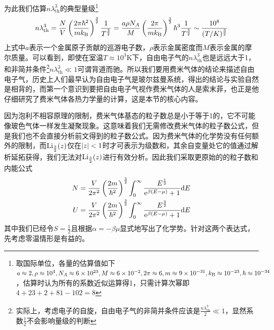 \documentclass[../../main.tex]{subfiles}
\begin{document}
为此我们估算\(n\lambda_{\mathrm{th}}^3\)的典型量级\footnote{取国际单位，各量的估算值如下\(a\approx2,\rho\approx10^{4},N_A\approx6\times10^{23},M\approx6\times10^{-2},2\pi\approx6,m\approx9\times10^{-31},k_{\mathrm{B}}\approx10^{-23},\hbar\approx10^{-34}\)，估算时认为所有的系数近似运算得1，只需计算次幂即\(4+23+2+81-102=8\)}
\begin{equation}
    n\lambda_{\mathrm{th}}^3=\frac{N}{V}\left(\frac{2\pi\hbar^2}{mk_{\mathrm{B}}}\right)^{\frac{3}{2}}\frac{1}{T^{\frac{3}{2}}}=\frac{a\rho N_A}{M}\left(\frac{2\pi}{mk_{\mathrm{B}}}\right)^{\frac{3}{2}}\hbar^3\frac{1}{T^{\frac{3}{2}}}\sim \frac{10^8}{(T/K)^{\frac{3}{2}}}
\end{equation}
上式中\(a\)表示一个金属原子贡献的巡游电子数，\(\rho\)表示金属密度而\(M\)表示金属的摩尔质量。可以看到，即使在室温\(T\approx10^3 \mathrm{K}\)下，自由电子气的\(n\lambda_{\mathrm{th}}^3\)也是远远大于1，和非简并条件\footnote{实际上，考虑电子的自旋，自由电子气的非简并条件应该是\(\frac{n\lambda_{\mathrm{th}}^3}{2}\ll 1\)，显然系数\(\frac{1}{2}\)不会影响量级的判断}\(n\lambda_{\mathrm{th}}^3\ll1\)可谓背道而驰。所以我们要用费米气体的结论来描述自由电子气，历史上人们最早认为自由电子气是玻尔兹曼系统，得出的结论与实验自然是相背的，而第一个意识到要把自由电子气视作费米气体的人是索末菲，也正是他仔细研究了费米气体各热力学量的计算，这是本节的核心内容。

因为泡利不相容原理的限制，费米气体基态的粒子数总是小于等于1的，它不可能像玻色气体一样发生凝聚现象。这意味着我们无需修改费米气体的粒子数公式，但是我们也不会直接分析前文得到的粒子数公式。因为费米气体的化学势没有任何额外的限制，而\(\mathrm{Li}_{\frac{3}{2}}(z)\)仅在\(\abs{z}<1\)时才可表示为级数和，其余自变量处它的值通过解析延拓获得，我们无法对\(\mathrm{Li}_{\frac{3}{2}}(z)\)进行有效分析。因此我们采取更原始的的粒子数和内能公式
\begin{equation}
    \begin{split}
        N&=\frac{V}{2\pi^2}\left(\frac{2m}{\hbar^2}\right)^{\frac{3}{2}}\int_0^{\infty}\frac{E^{\frac{1}{2}}}{\mathrm{e}^{\beta(E-\mu)}+1}\dd E \\
        U&=\frac{V}{2\pi^2}\left(\frac{2m}{\hbar^2}\right)^{\frac{3}{2}}\int_0^{\infty}\frac{E^{\frac{3}{2}}}{\mathrm{e}^{\beta(E-\mu)}+1}\dd E
    \end{split}
\end{equation}
其中我们已经令\(S=\frac{1}{2}\)且根据\(\alpha=-\beta\mu\)显式地写出了化学势。针对这两个表达式，先考虑零温情形是有益的。
\end{document}
